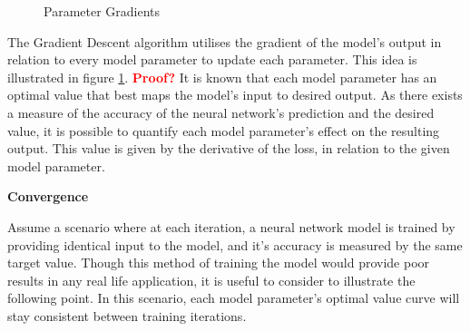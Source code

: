 \begin{figure}
    \centering
    \qquad
    \caption{Parameter Gradients}%
    \label{fig:parameter_gradient}%
\end{figure}

The Gradient Descent algorithm utilises the gradient of the model's output in relation to every model parameter
to update each parameter. This idea is illustrated in figure \ref{fig:parameter_gradient}. 
\textcolor{red}{\textbf{Proof?}} It is known that each model parameter has an optimal value that best maps the model's input to desired output.
As there exists a measure of the accuracy of the neural network's prediction and the desired value, 
it is possible to quantify each model parameter's effect on the resulting output. 
This value is given by the derivative of the loss, in relation to the given model parameter.


\textbf{Convergence}

Assume a scenario where at each iteration, a neural network model is trained by providing identical input to the model, 
and it's accuracy is measured by the same target value. Though this method of training the model would provide poor results in any real life application,
it is useful to consider to illustrate the following point. In this scenario, each model parameter's optimal value curve will stay consistent between training iterations.

